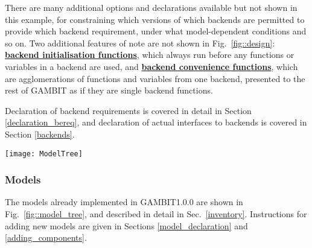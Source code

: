 \documentclass[pdftex,twocolumn,epjc3_preprint,runningheads]{svjour3}
\renewcommand{\_}{\discretionary{\underscore}{}{\underscore}}
\newcommand\term[1]{{\lstset{style=terminal}\lstinline!#1!\lstset{style=cpp}}}
\newcommand{\doublecross}[2]{\hyperref[#2]{\textbf{#1}}}
\newcommand{\gambit}{\textsf{GAMBIT}\xspace}
\newcommand{\GB}{\gambit}
\begin{document}
There are many additional options and declarations available but not shown in this example, for constraining which versions of which backends are permitted to provide which backend requirement, under what model-dependent conditions and so on.  Two additional features of note are not shown in Fig.\ \ref{fig::design}: \doublecross{backend initialisation functions}{backend initialisation function}, which always run before any functions or variables in a backend are used, and \doublecross{backend convenience functions}{backend convenience function}, which are agglomerations of functions and variables from one backend, presented to the rest of \GB as if they are single backend functions.

Declaration of backend requirements is covered in detail in Section \ref{declaration_bereq}, and declaration of actual interfaces to backends is covered in Section \ref{backends}.

\begin{figure*}[tp]
\centering
\texttt{[image: ModelTree]}
\caption{The model hierarchy graph of the pre-defined models that ship with \GB \textsf{1.0.0}. The graph forms a set of disconnected directed trees, potentially linked by \doublecross{friend}{friend model} translation pathways. Nodes are individual \doublecross{models}{model}. Black arrows indicate \doublecross{child}{child model}-to-\doublecross{parent}{parent model} translation pathways. The red arrows from \textsf{MSSM9atQ} to \textsf{MSSM10batQ}, and from \textsf{MSSM19atQ} to \textsf{MSSM20atQ}, indicate translations to \doublecross{friend models}{friend model}.  Friend translations can cross between otherwise disconnected family trees, or, as in these two examples, between different branches of the same tree. Graphs like this (including any additional user-specified models) can be generated by running \protect\term{gambit models} from the command line, and following the instructions provided.}
\label{fig::model_tree}
\end{figure*}

\subsubsection{Models}

The models already implemented in \GB \textsf{1.0.0} are shown in Fig.\ \ref{fig::model_tree}, and described in detail in Sec.\ \ref{inventory}.  Instructions for adding new models are given in Sections \ref{model_declaration} and \ref{adding_components}.
\end{document}
